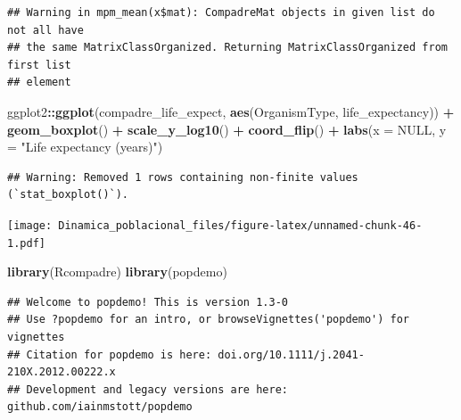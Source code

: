 \documentclass[
]{book}
\newenvironment{Shaded}{\begin{snugshade}}{\end{snugshade}}
\newcommand{\AttributeTok}[1]{\textcolor[rgb]{0.13,0.29,0.53}{#1}}
\newcommand{\CommentTok}[1]{\textcolor[rgb]{0.56,0.35,0.01}{\textit{#1}}}
\newcommand{\ConstantTok}[1]{\textcolor[rgb]{0.56,0.35,0.01}{#1}}
\newcommand{\FunctionTok}[1]{\textcolor[rgb]{0.13,0.29,0.53}{\textbf{#1}}}
\newcommand{\NormalTok}[1]{#1}
\newcommand{\OtherTok}[1]{\textcolor[rgb]{0.56,0.35,0.01}{#1}}
\newcommand{\SpecialCharTok}[1]{\textcolor[rgb]{0.81,0.36,0.00}{\textbf{#1}}}
\newcommand{\StringTok}[1]{\textcolor[rgb]{0.31,0.60,0.02}{#1}}
\theoremstyle{definition}
\theoremstyle{definition}
\theoremstyle{definition}
\theoremstyle{definition}
\theoremstyle{remark}
\begin{document}
\begin{verbatim}
## Warning in mpm_mean(x$mat): CompadreMat objects in given list do not all have
## the same MatrixClassOrganized. Returning MatrixClassOrganized from first list
## element
\end{verbatim}

\begin{Shaded}
\begin{Highlighting}[]
\NormalTok{ggplot2}\SpecialCharTok{::}\FunctionTok{ggplot}\NormalTok{(compadre\_life\_expect, }\FunctionTok{aes}\NormalTok{(OrganismType, life\_expectancy)) }\SpecialCharTok{+}
  \FunctionTok{geom\_boxplot}\NormalTok{() }\SpecialCharTok{+}
  \FunctionTok{scale\_y\_log10}\NormalTok{() }\SpecialCharTok{+}
  \FunctionTok{coord\_flip}\NormalTok{() }\SpecialCharTok{+}
  \FunctionTok{labs}\NormalTok{(}\AttributeTok{x =} \ConstantTok{NULL}\NormalTok{, }\AttributeTok{y =} \StringTok{"Life expectancy (years)"}\NormalTok{)}
\end{Highlighting}
\end{Shaded}

\begin{verbatim}
## Warning: Removed 1 rows containing non-finite values (`stat_boxplot()`).
\end{verbatim}

\texttt{[image: Dinamica\_poblacional\_files/figure-latex/unnamed-chunk-46-1.pdf]}

\begin{Shaded}
\begin{Highlighting}[]
\FunctionTok{library}\NormalTok{(Rcompadre)}
\FunctionTok{library}\NormalTok{(popdemo)}
\end{Highlighting}
\end{Shaded}

\begin{verbatim}
## Welcome to popdemo! This is version 1.3-0
## Use ?popdemo for an intro, or browseVignettes('popdemo') for vignettes
## Citation for popdemo is here: doi.org/10.1111/j.2041-210X.2012.00222.x
## Development and legacy versions are here: github.com/iainmstott/popdemo
\end{verbatim}

\begin{Shaded}
\end{Shaded}
\end{document}
